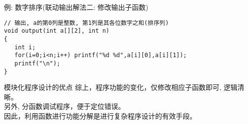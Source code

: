 \begin{frame}{例: 数字排序(联动输出解法二: 修改输出子函数)}
\begin{lstlisting}
// 输出, a的第0列是整数, 第1列是其各位数字之和(排序列)
void output(int a[][2], int n)
{
   int i;
   for(i=0;i<n;i++) printf("%d %d",a[i][0],a[i][1]);
   printf("\n");
}
\end{lstlisting}

\begin{block}{模块化程序设计的优点}
	综上，程序功能的变化，仅修改相应子函数即可, 逻辑清晰。\\
	另外, 分函数调试程序，便于定位错误。\\
	因此，利用函数进行功能分解是进行复杂程序设计的有效手段。
\end{block}
\end{frame}






